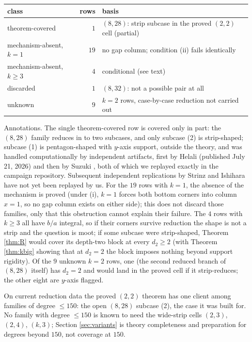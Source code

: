 \documentclass[11pt]{article}
\theoremstyle{definition}
\theoremstyle{remark}
\begin{document}
\begin{center}
\begin{tabular}{lrl}
\toprule
class & rows & basis \\
\midrule
theorem-covered & $1$ & $(8,28)$: strip subcase in the proved $(2,2)$ cell (partial) \\
mechanism-absent, $k=1$ & $19$ & no gap column; condition (ii) fails identically \\
mechanism-absent, $k\geq3$ & $4$ & conditional (see text) \\
discarded & $1$ & $(8,32)$: not a possible pair at all \cite{GGHV} \\
unknown & $9$ & $k=2$ rows, case-by-case reduction not carried out \\
\bottomrule
\end{tabular}
\end{center}

Annotations. The single theorem-covered row is covered only in part: the $(8,28)$ family reduces in \cite{GGHV} to two subcases, and only subcase (2) is strip-shaped; subcase (1) is pentagon-shaped with $y$-axis support, outside the theory, and was handled computationally by independent artifacts, first by Helali \cite{Helali} (published July 21, 2026) and then by Suzuki \cite{Suzuki}, both of which we replayed exactly in the campaign repository. Subsequent independent replications by Strinz \cite{Strinz} and Ishihara \cite{Ishihara} have not yet been replayed by us. For the $19$ rows with $k=1$, the absence of the mechanism is proved (under (i), $k=1$ forces both bottom corners into column $x=1$, so no gap column exists on either side); this does not discard those families, only that this obstruction cannot explain their failure. The $4$ rows with $k\geq3$ all have $b/a$ integral, so if their corners survive reduction the shape is not a strip and the question is moot; if some subcase were strip-shaped, Theorem \ref{thm:R} would cover its depth-two block at every $d_2\geq2$ (with Theorem \ref{thm:kbig} showing that at $d_2=2$ the block imposes nothing beyond support rigidity). Of the $9$ unknown $k=2$ rows, one (the second reduced branch of $(8,28)$ itself) has $d_2=2$ and would land in the proved cell if it strip-reduces; the other eight are $y$-axis flagged.

On current reduction data the proved $(2,2)$ theorem has one client among families of degree $\leq150$: the open $(8,28)$ subcase (2), the case it was built for. No family with degree $\leq150$ is known to need the wide-strip cells $(2,3)$, $(2,4)$, $(k,3)$; Section \ref{sec:variants} is theory completeness and preparation for degrees beyond $150$, not coverage at $150$.
\end{document}
